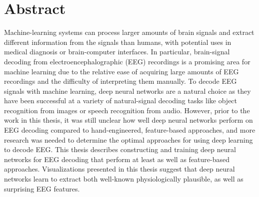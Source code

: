 \begingroup
\let\clearpage\relax
\let\cleardoublepage\relax
\let\cleardoublepage\relax

\chapter*{Abstract}
Machine-learning systems can process larger amounts of brain signals and extract different information from the signals than humans, with potential uses in medical diagnosis or brain-computer interfaces. In particular, brain-signal decoding from electroencephalographic (EEG) recordings is a promising area for machine learning due to the relative ease of acquiring large amounts of EEG recordings and the difficulty of interpreting them manually. To decode EEG signals with machine learning, deep neural networks are a natural choice as they have been successful at a variety of natural-signal decoding tasks like object recognition from images or speech recognition from audio. However, prior to the work in this thesis, it was still unclear how well deep neural networks perform on EEG decoding compared to hand-engineered, feature-based approaches, and more research was needed to determine the optimal approaches for using deep learning to decode EEG. This thesis describes constructing and training deep neural networks for EEG decoding that perform at least as well as feature-based approaches. Visualizations presented in this thesis suggest that deep neural networks learn to extract both well-known physiologically plausible, as well as surprising EEG features.

\vfill
\clearpage
\newpage

